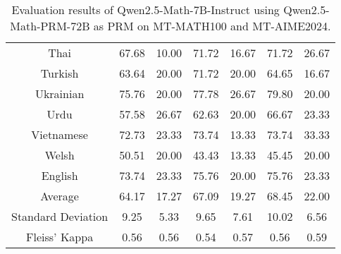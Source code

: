\begin{table*}[]
\begin{tabular}{c|cc|cc|cc}
Thai & 67.68 & 10.00 & 71.72 & 16.67 & 71.72 & 26.67 \\
Turkish & 63.64 & 20.00 & 71.72 & 20.00 & 64.65 & 16.67 \\
Ukrainian & 75.76 & 20.00 & 77.78 & 26.67 & 79.80 & 20.00 \\
Urdu & 57.58 & 26.67 & 62.63 & 20.00 & 66.67 & 23.33 \\
Vietnamese & 72.73 & 23.33 & 73.74 & 13.33 & 73.74 & 33.33 \\
Welsh & 50.51 & 20.00 & 43.43 & 13.33 & 45.45 & 20.00 \\
\rowcolor[HTML]{FCE5CD} 
English & 73.74 & 23.33 & 75.76 & 20.00 & 75.76 & 23.33 \\ \midrule
Average & 64.17 & 17.27 & 67.09 & 19.27 & 68.45 & 22.00 \\
Standard Deviation & 9.25 & 5.33 & 9.65 & 7.61 & 10.02 & 6.56 \\
Fleiss' Kappa & 0.56 & 0.56 & 0.54 & 0.57 & 0.56 & 0.59 \\ \bottomrule
\end{tabular}
\caption{\footnotesize Evaluation results of Qwen2.5-Math-7B-Instruct using Qwen2.5-Math-PRM-72B as PRM on MT-MATH100 and MT-AIME2024.}
\label{tab:7B_prm_72B}
\end{table*}

